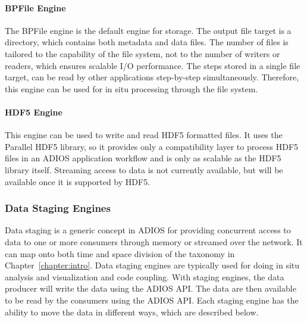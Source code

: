 \paragraph{\textbf{BPFile Engine}}
The BPFile engine is the default engine for storage.
The output file target is a directory, which contains both metadata and  data files. The number of files is tailored to the capability of the file system, not to the number of writers or readers, which ensures scalable I/O performance. The steps stored in a single file target, can be read by other applications step-by-step simultaneously. Therefore, this engine can be used for in situ processing through the file system.

\paragraph{\textbf{HDF5 Engine}}
This engine can be used to write and read HDF5 formatted files. It uses the Parallel HDF5 library, so it provides only a compatibility layer to process HDF5 files in an ADIOS application workflow and is only as scalable as the HDF5 library itself. Streaming access to data is not currently available, but will be available once it is supported by HDF5.
 
\subsubsection{Data Staging Engines}
Data staging is a generic concept in ADIOS for providing concurrent access to data to one or more consumers through memory or streamed over the network. It can map onto both time and space division of the taxonomy in Chapter~\ref{chapter:intro}. Data staging engines are typically used for doing in situ analysis and visualization and code coupling. With staging engines, the data producer will write the data using the ADIOS API. The data are then available to be read by the consumers using the ADIOS API. Each staging engine has the ability to move the data in different ways, which are described below.

